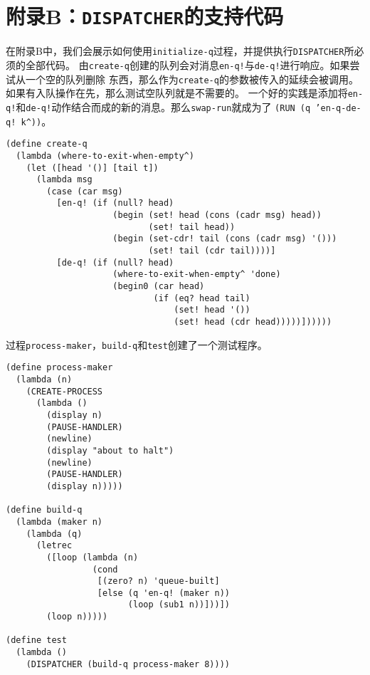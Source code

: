 \documentclass[12pt]{article}
\begin{document}
\section{附录B：\texttt{DISPATCHER}的支持代码}
\indent{}在附录B中，我们会展示如何使用\texttt{initialize-q}过程，并提供执行\texttt{DISPATCHER}所必须的全部代码。
由\texttt{create-q}创建的队列会对消息\texttt{en-q!}与\texttt{de-q!}进行响应。如果尝试从一个空的队列删除
东西，那么作为\texttt{create-q}的参数被传入的延续会被调用。如果有入队操作在先，那么测试空队列就是不需要的。
一个好的实践是添加将\texttt{en-q!}和\texttt{de-q!}动作结合而成的新的消息。那么\texttt{swap-run}就成为了
\texttt{(RUN (q 'en-q-de-q! k\^{}))}。
\begin{verbatim}
(define create-q
  (lambda (where-to-exit-when-empty^)
    (let ([head '()] [tail t])
      (lambda msg
        (case (car msg)
          [en-q! (if (null? head)
                     (begin (set! head (cons (cadr msg) head))
                            (set! tail head))
                     (begin (set-cdr! tail (cons (cadr msg) '()))
                            (set! tail (cdr tail))))]
          [de-q! (if (null? head)
                     (where-to-exit-when-empty^ 'done)
                     (begin0 (car head)
                             (if (eq? head tail)
                                 (set! head '())
                                 (set! head (cdr head)))))])))))
\end{verbatim}
\noindent{}过程\texttt{process-maker}，\texttt{build-q}和\texttt{test}创建了一个测试程序。
\begin{verbatim}
(define process-maker
  (lambda (n)
    (CREATE-PROCESS
      (lambda ()
        (display n)
        (PAUSE-HANDLER)
        (newline)
        (display "about to halt")
        (newline)
        (PAUSE-HANDLER)
        (display n)))))

(define build-q
  (lambda (maker n)
    (lambda (q)
      (letrec
        ([loop (lambda (n)
                 (cond
                  [(zero? n) 'queue-built]
                  [else (q 'en-q! (maker n))
                        (loop (sub1 n))]))])
        (loop n)))))

(define test
  (lambda ()
    (DISPATCHER (build-q process-maker 8))))
\end{verbatim}
\end{document}
